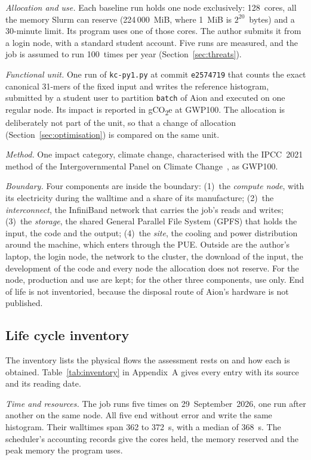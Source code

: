\documentclass[conference,a4paper]{IEEEtran}
\begin{document}
\emph{Allocation and use.} Each baseline run holds one node exclusively:
128~cores, all the memory Slurm can reserve (224\,000~MiB, where 1~MiB is
$2^{20}$~bytes) and a 30-minute limit. Its program uses one of those cores. The
author submits it from a login node, with a standard student account. Five runs
are measured, and the job is assumed to run 100~times per year
(Section~\ref{sec:threats}).

\emph{Functional unit.} One run of \texttt{kc-py1.py} at commit
\texttt{e2574719} that counts the exact canonical 31-mers of the fixed input and
writes the reference histogram, submitted by a student user to partition
\texttt{batch} of Aion and executed on one regular node. Its impact is reported
in gCO\textsubscript{2}e at GWP100. The allocation is deliberately not part of
the unit, so that a change of allocation (Section~\ref{sec:optimisation}) is
compared on the same unit.

\emph{Method.} One impact category, climate change, characterised with the
IPCC~2021 method of the Intergovernmental Panel on Climate
Change~\cite{ipcc2021}, as GWP100.

\emph{Boundary.} Four components are inside the boundary:
(1)~the \emph{compute node}, with its electricity during the walltime and a
share of its manufacture;
(2)~the \emph{interconnect}, the InfiniBand network that carries the job's
reads and writes;
(3)~the \emph{storage}, the shared General Parallel File System (GPFS) that
holds the input, the code and the output;
(4)~the \emph{site}, the cooling and power distribution around the machine,
which enters through the PUE.
Outside are the author's laptop, the login node, the network to the cluster,
the download of the input, the development of the code and every node the
allocation does not reserve. For the node, production and use are kept; for the
other three components, use only. End of life is not inventoried, because the
disposal route of Aion's hardware is not published.

\subsection{Life cycle inventory}\label{sec:lci}
The inventory lists the physical flows the assessment rests on and how each is
obtained. Table~\ref{tab:inventory} in Appendix~A gives every entry with its
source and its reading date.

\emph{Time and resources.} The job runs five times on 29~September~2026, one
run after another on the same node. All five end without error and write the
same histogram. Their walltimes span 362 to 372~s, with a median of 368~s. The
scheduler's accounting records give the cores held, the memory reserved and the
peak memory the program uses.
\end{document}
